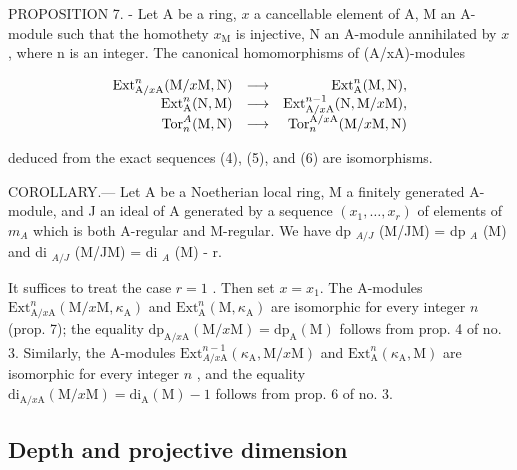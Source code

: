 PROPOSITION 7. - Let A be a ring, \(x\) a cancellable element of A, M an A-module such that the homothety \(x_{\mathrm{M}}\) is injective, N an A-module annihilated by \(x\), where n is an integer. The canonical homomorphisms of (A/xA)-modules

\[
\begin{array}{r l r} \mathrm{Ext} _ {\mathrm{A} / x \mathrm{A}} ^ {n} (\mathrm{M} / x \mathrm{M}, \mathrm{N}) & \longrightarrow & \mathrm{Ext} _ {\mathrm{A}} ^ {n} (\mathrm{M}, \mathrm{N}), \\ \mathrm{Ext} _ {\mathrm{A}} ^ {n} (\mathrm{N}, \mathrm{M}) & \longrightarrow & \mathrm{Ext} _ {\mathrm{A} / x \mathrm{A}} ^ {n - 1} (\mathrm{N}, \mathrm{M} / x \mathrm{M}), \\ \mathrm{Tor} _ {n} ^ {A} (\mathrm{M}, \mathrm{N}) & \longrightarrow & \mathrm{Tor} _ {n} ^ {\mathrm{A} / x \mathrm{A}} (\mathrm{M} / x \mathrm{M}, \mathrm{N}) \end{array}
\]

deduced from the exact sequences (4), (5), and (6) are isomorphisms.

COROLLARY.--- Let A be a Noetherian local ring, M a finitely generated A-module, and J an ideal of A generated by a sequence \((x_{1},\ldots,x_{r})\) of elements of \(m_{A}\) which is both A-regular and M-regular. We have dp \(_{A/J}\) (M/JM) = dp \(_{A}\) (M) and di \(_{A/J}\) (M/JM) = di \(_{A}\) (M) - r.

It suffices to treat the case \(r = 1\) . Then set \(x = x_1\). The A-modules \(\mathrm{Ext}_{\mathrm{A} / x\mathrm{A}}^{n}(\mathrm{M} / x\mathrm{M},\kappa_{\mathrm{A}})\) and \(\mathrm{Ext}_{\mathrm{A}}^{n}(\mathrm{M},\kappa_{\mathrm{A}})\) are isomorphic for every integer \(n\) (prop. 7); the equality \(\mathrm{dp}_{\mathrm{A} / x\mathrm{A}}(\mathrm{M} / x\mathrm{M}) = \mathrm{dp}_{\mathrm{A}}(\mathrm{M})\) follows from prop. 4 of no. 3. Similarly, the A-modules \(\mathrm{Ext}_{A /x\mathrm{A}}^{n - 1}(\kappa_{\mathrm{A}},\mathrm{M} / x\mathrm{M})\) and \(\mathrm{Ext}_{\mathrm{A}}^{n}(\kappa_{\mathrm{A}},\mathrm{M})\) are isomorphic for every integer \(n\) , and the equality \(\mathrm{di}_{\mathrm{A} / x\mathrm{A}}(\mathrm{M} / x\mathrm{M}) = \mathrm{di}_{\mathrm{A}}(\mathrm{M}) - 1\) follows from prop. 6 of no. 3.

\subsection{Depth and projective dimension}

